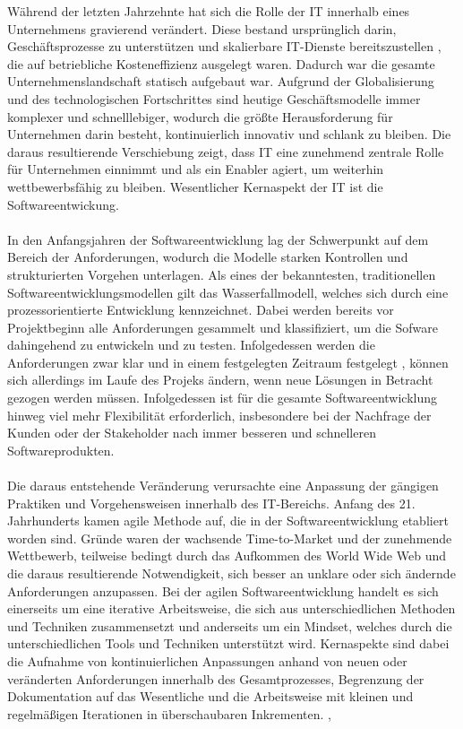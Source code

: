 Während der letzten Jahrzehnte hat sich die Rolle der IT innerhalb eines Unternehmens gravierend verändert. Diese bestand ursprünglich darin, Geschäftsprozesse zu unterstützen und skalierbare IT-Dienste bereitszustellen \cite{haffke_transformative_2017}, die auf betriebliche Kosteneffizienz ausgelegt waren. Dadurch war die gesamte Unternehmenslandschaft statisch aufgebaut war. \cite[S. 16]{ravichandran_devops_2016} Aufgrund der Globalisierung und des technologischen Fortschrittes sind heutige Geschäftsmodelle immer komplexer und schnelllebiger, wodurch die größte Herausforderung für Unternehmen darin besteht, kontinuierlich innovativ und schlank zu bleiben. \cite{haffke_transformative_2017} Die daraus resultierende Verschiebung zeigt, dass IT eine zunehmend zentrale Rolle für Unternehmen einnimmt und als ein Enabler agiert, um weiterhin wettbewerbsfähig zu bleiben. \cite{haffke_transformative_2017} Wesentlicher Kernaspekt der IT ist die Softwareentwickung.\\\\ In den Anfangsjahren der Softwareentwicklung lag der Schwerpunkt auf dem Bereich der Anforderungen, wodurch die Modelle starken Kontrollen und strukturierten Vorgehen unterlagen. \cite{kneuper_sixty_2017} Als eines der bekanntesten, traditionellen Softwareentwicklungsmodellen gilt das Wasserfallmodell, welches sich durch eine prozessorientierte Entwicklung kennzeichnet. \cite{bakaji_waterfall_2012} Dabei werden bereits vor Projektbeginn alle Anforderungen gesammelt und klassifiziert, um die Sofware dahingehend zu entwickeln und zu testen. Infolgedessen werden die Anforderungen zwar klar und in einem festgelegten Zeitraum festgelegt \cite{bakaji_waterfall_2012}, können sich allerdings im Laufe des Projeks ändern, wenn neue Lösungen in Betracht gezogen werden müssen. Infolgedessen ist für die gesamte Softwareentwicklung hinweg viel mehr Flexibilität erforderlich, insbesondere bei der Nachfrage der Kunden oder der Stakeholder nach immer besseren und schnelleren Softwareprodukten. \cite[S. 17]{ravichandran_devops_2016} \\\\ Die daraus entstehende Veränderung verursachte eine Anpassung der gängigen Praktiken und Vorgehensweisen innerhalb des IT-Bereichs. Anfang des 21. Jahrhunderts kamen agile Methode auf, die in der Softwareentwicklung etabliert worden sind. Gründe waren der wachsende Time-to-Market und der zunehmende Wettbewerb, teilweise bedingt durch das Aufkommen des World Wide Web und die daraus resultierende Notwendigkeit, sich besser an unklare oder sich ändernde Anforderungen anzupassen. \cite{haffke_transformative_2017} Bei der agilen Softwareentwicklung handelt es sich einerseits um eine iterative Arbeitsweise, die sich aus unterschiedlichen Methoden und Techniken zusammensetzt und anderseits um ein Mindset, welches durch die unterschiedlichen Tools und Techniken unterstützt wird. Kernaspekte sind dabei die Aufnahme von kontinuierlichen Anpassungen anhand von neuen oder veränderten Anforderungen innerhalb des Gesamtprozesses, Begrenzung der Dokumentation auf das Wesentliche und die Arbeitsweise mit kleinen und regelmäßigen Iterationen in überschaubaren Inkrementen. \cite{cohen_introduction_2004}, 